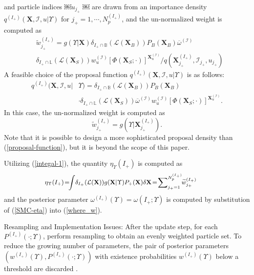 \documentclass[journal]{IEEEtran}
\newcommand{\bX}{{\mathbf X}}
\begin{document}
{and particle indices ￼$u_{j_{+}}$ ￼ are drawn from an importance density $q^{(I_{+})}(\bX,\mathcal{I},u|\Upsilon)$ for $j_{+}=1,\cdots,N_p^{(I_{+})}$, and the un-normalized weight is computed as 
\begin{equation}
\begin{split}
&\widetilde w_{j_{+}}^{(I_{+})}=
g(\Upsilon|\bX)\delta_{I_{+}\cap\mathbb{B}}(\mathcal{L}(\bX_{B})
)P_B(\bX_{B}) \overline\omega^{(\mathcal{I})}\\&\delta_{I_{+}\cap\mathbb{L}}(
\mathcal{L}(\bX_{S})) w_{u}^{(\mathcal{I})}[\Phi(\bX_S;\cdot)]^{\bX^{(\mathcal{I})}_u}
/q(\bX_{j_{+}}^{(I_{+})},\mathcal{I}_{j_{+}},u_{j_{+}})
\end{split}
\end{equation}
A  feasible choice of the  proposal function $q^{(I_{+})}(\bX,\mathcal{I},u|\Upsilon)$ is as follows:
\begin{equation}\label{proposal-function}
\begin{split}
q^{(I_{+})}(\bX, \mathcal{I},u|&\Upsilon)\!=\delta_{I_{+}\cap\mathbb{B}}(\mathcal{L}(\bX_{B})
)P_{B}(\bX_{B})\\& \cdot\delta_{I_{+}\cap\mathbb{L}}(
\mathcal{L}(\bX_{S})) \overline\omega^{(\mathcal{I})} w_{u}^{(\mathcal{I})}[\Phi(\bX_S;\cdot)]^{\bX^{(\mathcal{I})}_u}.
\end{split}
\end{equation}
In this case, the un-normalized weight is computed as 
$$\widetilde w_{j_{+}}^{(I_{+})}=g(\Upsilon|\bX^{(I_{+})}_{j_{+}}).$$
Note that it is possible to design a more sophisticated proposal density than (\ref{proposal-function}), but it is beyond the scope of this paper.


Utilizing (\ref{integal-1}), the quantity $\eta_\Upsilon(I_+)$ is computed as 
\begin{equation}\label{SMC-eta}
{\small
\begin{split}
\!\!\!\!\!\eta_\Upsilon(I_+)\!=\!&\!\int\! \delta_{I_+}(\mathcal{L}(\bX))g(\bX|\Upsilon)P_+(\bX)\delta\bX
\!=\!{\sum}_{j_+=1}^{N_p^{(I_+)}}\!\widetilde{w}^{(I_+)}_{j_+}
\end{split}}
\end{equation}
and the posterior parameter $\omega^{(I_+)}(\Upsilon)=\omega(I_+;\Upsilon)$ is computed by substitution of (\ref{SMC-eta}) into (\ref{where_w}).

Resampling and Implementation Issues: After the update step, for each $P^{(I_+)}(\cdot;\Upsilon)$, perform resampling \cite{refr:SMC_Gordon} to obtain an evenly weighted particle
set. To reduce the growing number of parameters, the pair of posterior parameters $(w^{(I_+)}(\Upsilon),P^{(I_+)}(\cdot;\Upsilon))$ with existence probabilities $w^{(I_+)}(\Upsilon)$ below a threshold are discarded \cite{refr:label_1,refr:label_3,refr:label_6}.






}
\end{document}
